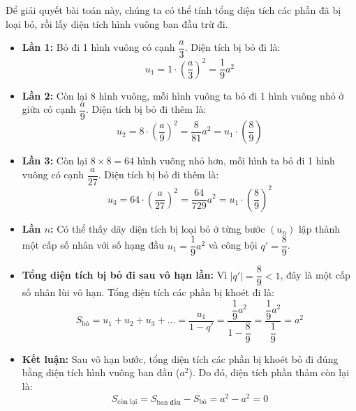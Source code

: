 \documentclass[12pt,a4paper,oneside]{book}
\theoremstyle{theorem}
\theoremstyle{definition}
\begin{document}
Để giải quyết bài toán này, chúng ta có thể tính tổng diện tích các phần đã bị loại bỏ, rồi lấy diện tích hình vuông ban đầu trừ đi.

\begin{itemize}
    \item \textbf{Lần 1:} Bỏ đi 1 hình vuông có cạnh $\dfrac{a}{3}$. Diện tích bị bỏ đi là:
    \[
    u_1 = 1 \cdot \left(\dfrac{a}{3}\right)^2 = \frac{1}{9}a^2
    \]
    
    \item \textbf{Lần 2:} Còn lại 8 hình vuông, mỗi hình vuông ta bỏ đi 1 hình vuông nhỏ ở giữa có cạnh $\dfrac{a}{9}$. Diện tích bị bỏ đi thêm là:
    \[
    u_2 = 8 \cdot \left(\frac{a}{9}\right)^2 = \frac{8}{81}a^2 = u_1 \cdot \left(\frac{8}{9}\right)
    \]
    
    \item \textbf{Lần 3:} Còn lại $8 \times 8 = 64$ hình vuông nhỏ hơn, mỗi hình ta bỏ đi 1 hình vuông có cạnh $\dfrac{a}{27}$. Diện tích bị bỏ đi thêm là:
    \[
    u_3 = 64 \cdot \left(\frac{a}{27}\right)^2 = \frac{64}{729}a^2 = u_1 \cdot \left(\frac{8}{9}\right)^2
    \]
    
    \item \textbf{Lần $n$:} Có thể thấy dãy diện tích bị loại bỏ ở từng bước $(u_n)$ lập thành một cấp số nhân với số hạng đầu $u_1 = \dfrac{1}{9}a^2$ và công bội $q' = \dfrac{8}{9}$.
    
    \item \textbf{Tổng diện tích bị bỏ đi sau vô hạn lần:} Vì $|q'| = \dfrac{8}{9} < 1$, đây là một cấp số nhân lùi vô hạn. Tổng diện tích các phần bị khoét đi là:
    \[
    S_{\text{bỏ}} = u_1 + u_2 + u_3 + \dots = \dfrac{u_1}{1 - q'} = \frac{\dfrac{1}{9}a^2}{1 - \dfrac{8}{9}} = \frac{\dfrac{1}{9}a^2}{\dfrac{1}{9}} = a^2
    \]
    
    \item \textbf{Kết luận:} Sau vô hạn bước, tổng diện tích các phần bị khoét bỏ đi đúng bằng diện tích hình vuông ban đầu ($a^2$). Do đó, diện tích phần thảm còn lại là:
    \[
    S_{\text{còn lại}} = S_{\text{ban đầu}} - S_{\text{bỏ}} = a^2 - a^2 = 0
    \]
\end{itemize}
\newpage
\end{document}
